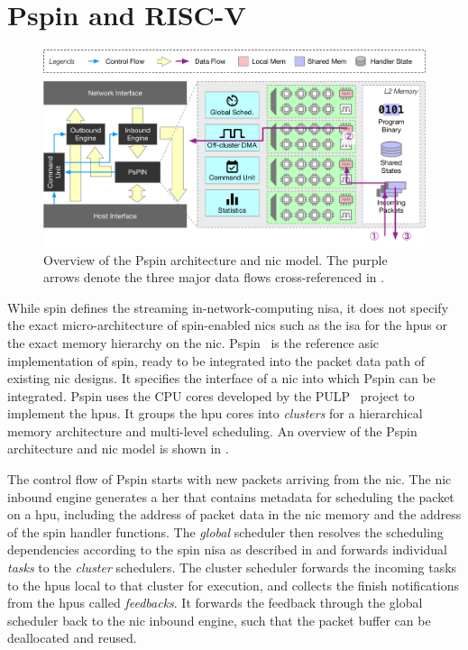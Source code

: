 \section{P\acs{spin} and RISC-V} \label{sec:background-pspin}

\begin{figure}[tp]
    \centering
    \includegraphics[width=\textwidth]{thesis/figures/pspin-arch.pdf}
    \caption{Overview of the P\acs{spin} architecture and \ac{nic} model.  The purple arrows denote the three major data flows cross-referenced in .} \label{fig:pspin-arch}
\end{figure}

While \ac{spin} defines the streaming in-network-computing \ac{nisa}, it does not specify the exact micro-architecture of \ac{spin}-enabled \ac{nic}s such as the \ac{isa} for the \ac{hpu}s or the exact memory hierarchy on the \ac{nic}.  P\acs{spin}~\cite{di_girolamo_pspin_2021} is the reference \ac{asic} implementation of \ac{spin}, ready to be integrated into the packet data path of existing \ac{nic} designs.  It specifies the interface of a \ac{nic} into which P\acs{spin} can be integrated.  P\acs{spin} uses the CPU cores developed by the PULP~\cite{rossi_pulp_2015} project to implement the \ac{hpu}s.  It groups the \ac{hpu} cores into \emph{clusters} for a hierarchical memory architecture and multi-level scheduling.  An overview of the P\acs{spin} architecture and \ac{nic} model is shown in .

The control flow of P\acs{spin} starts with new packets arriving from the \ac{nic}.  The \ac{nic} inbound engine generates a \ac{her} that contains metadata for scheduling the packet on a \ac{hpu}, including the address of packet data in the \ac{nic} memory and the address of the \ac{spin} handler functions.  The \emph{global} scheduler then resolves the scheduling dependencies according to the \ac{spin} \ac{nisa} as described in  and forwards individual \emph{tasks} to the \emph{cluster} schedulers.  The cluster scheduler forwards the incoming tasks to the \ac{hpu}s local to that cluster for execution, and collects the finish notifications from the \ac{hpu}s called \emph{feedbacks}.  It forwards the feedback through the global scheduler back to the \ac{nic} inbound engine, such that the packet buffer can be deallocated and reused.

